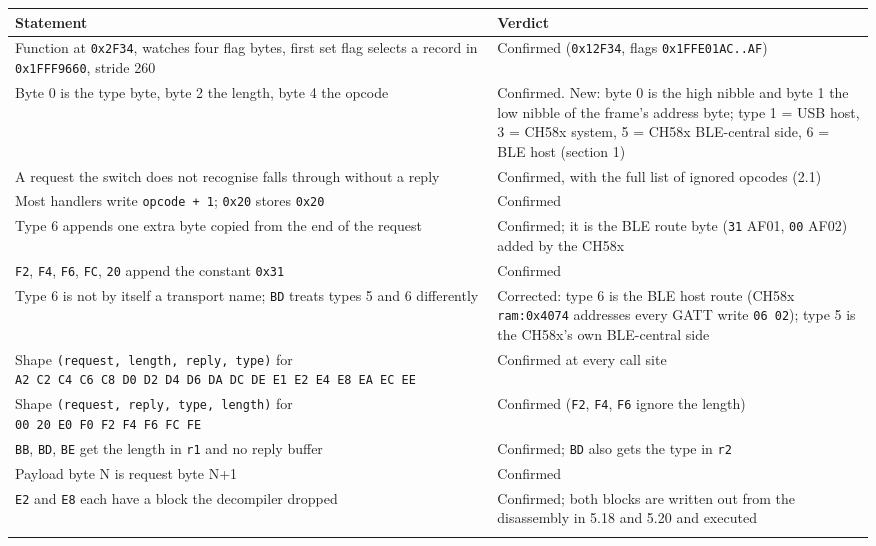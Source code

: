 {\def\LTcaptype{none} %
\begin{longtable}[]{@{}
  >{\raggedright\arraybackslash}p{}
  >{\raggedright\arraybackslash}p{}@{}}
\toprule\noalign{}
\begin{minipage}[b]{\linewidth}\raggedright
Statement
\end{minipage} & \begin{minipage}[b]{\linewidth}\raggedright
Verdict
\end{minipage} \\
\midrule\noalign{}
\endhead
\bottomrule\noalign{}
\endlastfoot
Function at \texttt{0x2F34}, watches four flag bytes, first set flag
selects a record in \texttt{0x1FFF9660}, stride 260 & Confirmed
(\texttt{0x12F34}, flags \texttt{0x1FFE01AC..AF}) \\
Byte 0 is the type byte, byte 2 the length, byte 4 the opcode &
Confirmed. New: byte 0 is the high nibble and byte 1 the low nibble of
the frame's address byte; type 1 = USB host, 3 = CH58x system, 5 = CH58x
BLE-central side, 6 = BLE host (section 1) \\
A request the switch does not recognise falls through without a reply &
Confirmed, with the full list of ignored opcodes (2.1) \\
Most handlers write \texttt{opcode\ +\ 1}; \texttt{0x20} stores
\texttt{0x20} & Confirmed \\
Type 6 appends one extra byte copied from the end of the request &
Confirmed; it is the BLE route byte (\texttt{31} AF01, \texttt{00} AF02)
added by the CH58x \\
\texttt{F2}, \texttt{F4}, \texttt{F6}, \texttt{FC}, \texttt{20} append
the constant \texttt{0x31} & Confirmed \\
Type 6 is not by itself a transport name; \texttt{BD} treats types 5 and
6 differently & Corrected: type 6 is the BLE host route (CH58x
\texttt{ram:0x4074} addresses every GATT write \texttt{06\ 02}); type 5
is the CH58x's own BLE-central side \\
Shape \texttt{(request,\ length,\ reply,\ type)} for
\texttt{A2\ C2\ C4\ C6\ C8\ D0\ D2\ D4\ D6\ DA\ DC\ DE\ E1\ E2\ E4\ E8\ EA\ EC\ EE}
& Confirmed at every call site \\
Shape \texttt{(request,\ reply,\ type,\ length)} for
\texttt{00\ 20\ E0\ F0\ F2\ F4\ F6\ FC\ FE} & Confirmed (\texttt{F2},
\texttt{F4}, \texttt{F6} ignore the length) \\
\texttt{BB}, \texttt{BD}, \texttt{BE} get the length in \texttt{r1} and
no reply buffer & Confirmed; \texttt{BD} also gets the type in
\texttt{r2} \\
Payload byte N is request byte N+1 & Confirmed \\
\texttt{E2} and \texttt{E8} each have a block the decompiler dropped &
Confirmed; both blocks are written out from the disassembly in 5.18 and
5.20 and executed \\*
\end{longtable}
}

